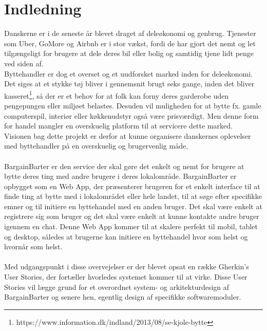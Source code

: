 \chapter{Indledning}
Danskerne er i de seneste år blevet draget af deleøkonomi og genbrug. Tjenester som Uber, GoMore og Airbnb er i stor vækst, fordi de har gjort det nemt og let tilgængeligt for brugere at dele deres bil eller bolig og samtidig tjene lidt penge ved siden af. \\
Byttehandler er dog et overset og et uudforsket marked inden for deleøkonomi. Det siges at et stykke tøj bliver i gennemsnit brugt seks gange, inden det bliver kasseret\footnote{https://www.information.dk/indland/2013/08/se-kjole-bytte}, så der er et behov for at folk kan forny deres garderobe uden pengepungen eller miljøet belastes. Desuden vil muligheden for at bytte fx. gamle computerspil, interiør eller køkkenudstyr også være prisværdigt. Men denne form for handel mangler en overskuelig platform til at servicere dette marked. \\ 
Visionen bag dette projekt er derfor at kunne organisere danskernes oplevelser med byttehandler på en overskuelig og brugervenlig måde. \\ \\
BargainBarter er den service der skal gøre det enkelt og nemt for brugere at bytte deres ting med andre brugere i deres lokalområde. BargainBarter er opbygget som en Web App, der præsenterer brugeren for et enkelt interface til at finde ting at bytte med i lokalområdet eller hele landet, til at søge efter specifikke emner og til initiere en byttehandel med en anden bruger. Det skal være enkelt at registrere sig som bruger og det skal være enkelt at kunne kontakte andre bruger igennem en chat. Denne Web App kommer til at skalere perfekt til mobil, tablet og desktop, således at brugerne kan initiere en byttehandel hvor som helst og hvornår som helst.  \\ \\
Med udgangspunkt i disse overvejelser er der blevet opsat en række Gherkin's User Stories, der fortæller hvorledes systemet kommer til at virke. Disse User Stories vil lægge grund for et overordnet system- og arkitekturdesign af BargainBarter og senere hen, egentlig design af specifikke softwaremoduler.   